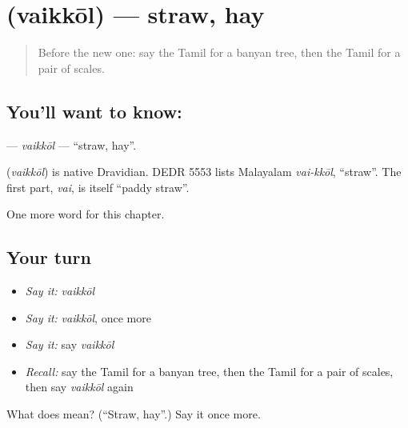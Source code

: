 \section[\texorpdfstring{\ta{வைக்கோல்} (vaikkōl)}{வைக்கோல் (vaikkōl)}]{ (vaikkōl) — straw, hay}

\label{lesson:TA-C250-vaikkol}



\begin{quote}
Before the new one: say the Tamil for a banyan tree, then the Tamil for a pair of scales.
\end{quote}

\subsection*{You'll want to know: }
\textbf{} — \emph{vaikkōl} — \textquotedblleft{}straw, hay\textquotedblright{}.

\begin{cousinweb}
\textbf{} (\emph{vaikkōl}) is native Dravidian. DEDR 5553 lists Malayalam \emph{vai-kkōl}, \textquotedblleft{}straw\textquotedblright{}. The first part, \emph{vai}, is itself \textquotedblleft{}paddy straw\textquotedblright{}.
\end{cousinweb}

\begin{grammarlens}[title={What you've built}]
One more word for this chapter.
\end{grammarlens}

\subsection*{Your turn}
\begin{itemize}
\raggedright
  \item \emph{Say it:} \emph{vaikkōl}
  \item \emph{Say it:} \emph{vaikkōl}, once more
  \item \emph{Say it:} say \emph{vaikkōl}
  \item \emph{Recall:} say the Tamil for a banyan tree, then the Tamil for a pair of scales, then say \emph{vaikkōl} again
\end{itemize}

\begin{tcolorbox}[breakable,colback=teal!4,colframe=teal!35!black,title={Before you move on}]
What does  mean? (\textquotedblleft{}Straw, hay\textquotedblright{}.) Say it once more.
\end{tcolorbox}

